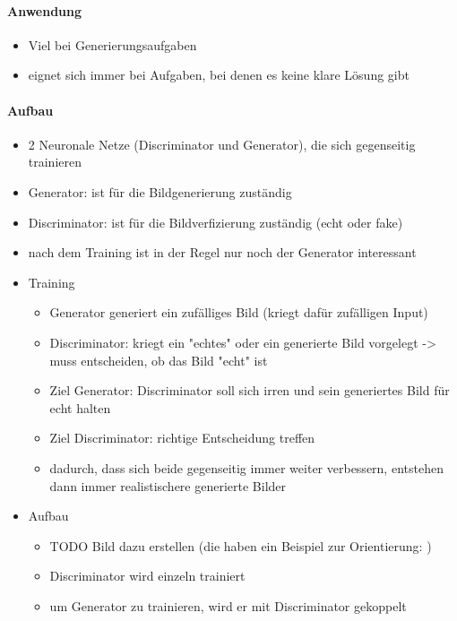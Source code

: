 \paragraph{Anwendung}
\begin{itemize}
	\item Viel bei Generierungsaufgaben
	\item eignet sich immer bei Aufgaben, bei denen es keine klare Lösung gibt
\end{itemize}


\paragraph{Aufbau \cite{gan-original-paper, hyperparameters-gan-using-genetic-algorithm}}
\begin{itemize}
	\item 2 Neuronale Netze (Discriminator und Generator), die sich gegenseitig trainieren
	\item Generator: ist für die Bildgenerierung zuständig
	\item Discriminator: ist für die Bildverfizierung zuständig (echt oder fake)
	\item nach dem Training ist in der Regel nur noch der Generator interessant
	
	\item Training
	\begin{itemize}
		\item Generator generiert ein zufälliges Bild (kriegt dafür zufälligen Input)
		\item Discriminator: kriegt ein "echtes" oder ein generierte Bild vorgelegt -> muss entscheiden, ob das Bild "echt" ist
		\item Ziel Generator: Discriminator soll sich irren und sein generiertes Bild für echt halten
		\item Ziel Discriminator: richtige Entscheidung treffen
		\item dadurch, dass sich beide gegenseitig immer weiter verbessern, entstehen dann immer realistischere generierte Bilder
	\end{itemize}
	
	\item Aufbau
	\begin{itemize}
		\item TODO Bild dazu erstellen (die haben ein Beispiel zur Orientierung: \cite{hyperparameters-gan-using-genetic-algorithm})
		\item Discriminator wird einzeln trainiert
		\item um Generator zu trainieren, wird er mit Discriminator gekoppelt
	\end{itemize}
	

\end{itemize}
